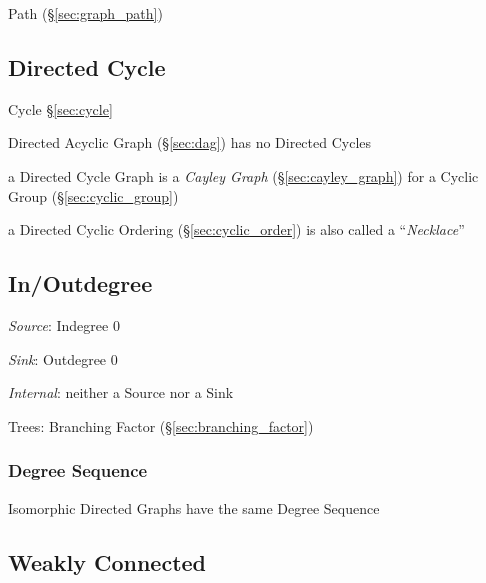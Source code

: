 Path (\S\ref{sec:graph_path})



\subsection{Directed Cycle}\label{sec:directed_cycle}

Cycle \S\ref{sec:cycle}

Directed Acyclic Graph (\S\ref{sec:dag}) has no Directed Cycles

a Directed Cycle Graph is a \emph{Cayley Graph} (\S\ref{sec:cayley_graph})
for a Cyclic Group (\S\ref{sec:cyclic_group})

a Directed Cyclic Ordering (\S\ref{sec:cyclic_order}) is also called a
``\emph{Necklace}''



\subsection{In/Outdegree}\label{sec:inoutdegree}

\emph{Source}: Indegree $0$

\emph{Sink}: Outdegree $0$

\emph{Internal}: neither a Source nor a Sink


Trees: Branching Factor (\S\ref{sec:branching_factor})



\subsubsection{Degree Sequence}\label{sec:degree_sequence}

Isomorphic Directed Graphs have the same Degree Sequence



\subsection{Weakly Connected}\label{sec:weakly_connected}


